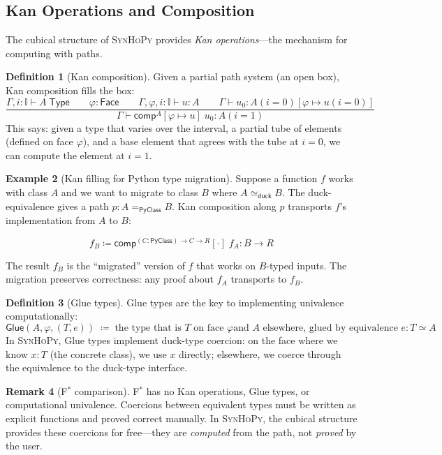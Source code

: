 \documentclass[11pt,a4paper]{report}
\theoremstyle{definition}
\newtheorem{definition}{Definition}[chapter]
\newtheorem{example}[definition]{Example}
\newtheorem{remark}[definition]{Remark}
\theoremstyle{plain}
\newcommand{\Type}{\mathsf{Type}}
\newcommand{\PyClass}{\mathsf{PyClass}}
\newcommand{\interval}{\mathbb{I}}
\newcommand{\comp}{\mathsf{comp}}
\newcommand{\defeq}{\coloneqq}
\newcommand{\Glue}{\mathsf{Glue}}
\newcommand{\fstar}{F$^{*}$}
\newcommand{\synhopy}{\textsc{SynHoPy}}
\begin{document}
\subsection{Kan Operations and Composition}

The cubical structure of \synhopy{} provides \emph{Kan operations}---the
mechanism for computing with paths.

\begin{definition}[Kan composition]
Given a partial path system (an open box), Kan composition fills the box:
\[
  \frac{
    \Gamma, i : \interval \vdash A \;\Type \qquad
    \varphi : \mathsf{Face} \qquad
    \Gamma, \varphi, i : \interval \vdash u : A \qquad
    \Gamma \vdash u_0 : A(i=0)[\varphi \mapsto u(i=0)]
  }{
    \Gamma \vdash \comp^A[\varphi \mapsto u]\; u_0 : A(i=1)
  }
\]
This says: given a type that varies over the interval, a partial tube of
elements (defined on face $\varphi$), and a base element that agrees with the
tube at $i=0$, we can compute the element at $i=1$.
\end{definition}

\begin{example}[Kan filling for Python type migration]
Suppose a function $f$ works with class $A$ and we want to migrate to class $B$
where $A \simeq_{\mathsf{duck}} B$.  The duck-equivalence gives a path
$p : A =_{\PyClass} B$.  Kan composition along $p$ transports $f$'s
implementation from $A$ to $B$:

\[
  f_B \defeq \comp^{(C : \PyClass) \to C \to R}[\cdot]\; f_A : B \to R
\]

The result $f_B$ is the ``migrated'' version of $f$ that works on $B$-typed
inputs.  The migration preserves correctness: any proof about $f_A$ transports
to $f_B$.
\end{example}

\begin{definition}[Glue types]
Glue types are the key to implementing univalence computationally:
\[
  \Glue(A, \varphi, (T, e)) \;\defeq\; \text{the type that is $T$ on face $\varphi$
    and $A$ elsewhere, glued by equivalence $e : T \simeq A$}
\]
In \synhopy{}, Glue types implement duck-type coercion: on the face where we
know $x : T$ (the concrete class), we use $x$ directly; elsewhere, we coerce
through the equivalence to the duck-type interface.
\end{definition}

\begin{remark}[\fstar{} comparison]
\fstar{} has no Kan operations, Glue types, or computational univalence.
Coercions between equivalent types must be written as explicit functions and
proved correct manually.  In \synhopy{}, the cubical structure provides these
coercions for free---they are \emph{computed} from the path, not \emph{proved}
by the user.
\end{remark}
\end{document}
